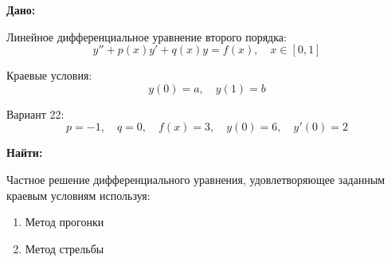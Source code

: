 \textbf{Дано:}

Линейное дифференциальное уравнение второго порядка:
\[
    y'' + p(x)y' + q(x)y = f(x), \quad x \in [0, 1]
\]

Краевые условия:
\[
    y(0) = a, \quad y(1) = b
\]

Вариант 22:
\[
    p = -1, \quad q = 0, \quad f(x) = 3, \quad y(0) = 6, \quad y'(0) = 2
\]

\textbf{Найти:}

Частное решение дифференциального уравнения, удовлетворяющее заданным краевым условиям
используя:
\begin{enumerate}
    \item Метод прогонки
    \item Метод стрельбы
\end{enumerate}



